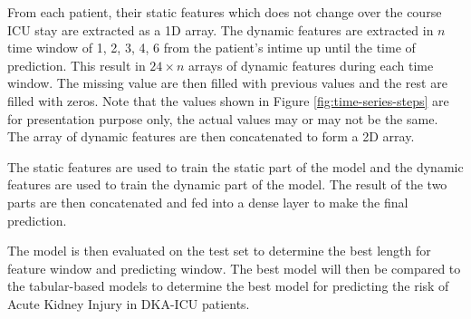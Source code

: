 \documentclass[../main.tex]{subfiles}
\begin{document}
From each patient, their static features which does not change over the course ICU stay are extracted as a 1D array.
The dynamic features are extracted in $n$ time window of 1, 2, 3, 4, 6 from the patient's intime up until the time of prediction.
This result in $24 \times n$ arrays of dynamic features during each time window.
The missing value are then filled with previous values and the rest are filled with zeros.
Note that the values shown in Figure \ref{fig:time-series-steps} are for presentation purpose only, the actual values may or may not be the same.
The array of dynamic features are then concatenated to form a 2D array.

The static features are used to train the static part of the model and the dynamic features are used to train the dynamic part of the model.
The result of the two parts are then concatenated and fed into a dense layer to make the final prediction.

The model is then evaluated on the test set to determine the best length for feature window and predicting window.
The best model will then be compared to the tabular-based models to determine the best model for predicting the risk of Acute Kidney Injury in DKA-ICU patients.
\end{document}
